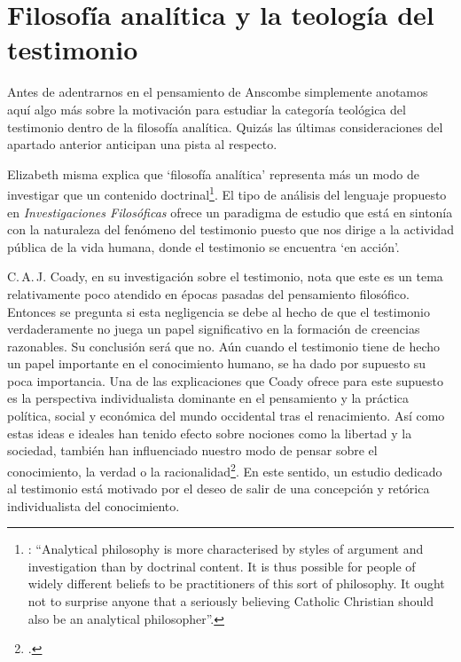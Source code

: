 \section{Filosofía analítica y la teología del testimonio}

Antes de adentrarnos en el pensamiento de Anscombe simplemente anotamos aquí algo más sobre la motivación para estudiar la categoría teológica del testimonio dentro de la filosofía analítica. Quizás las últimas consideraciones del apartado anterior anticipan una pista al respecto.

Elizabeth misma explica que `filosofía analítica' representa más un modo de investigar que un contenido doctrinal\footnote{\Cite[66]{anscombe2008faith:twenty}: \enquote{Analytical philosophy is more characterised by styles of argument and investigation than by doctrinal content. It is thus possible for people of widely different beliefs to be practitioners of this sort of philosophy. It ought not to surprise anyone that a seriously believing Catholic Christian should also be an analytical philosopher}.}. El tipo de análisis del lenguaje propuesto en \emph{Investigaciones Filosóficas} ofrece un paradigma de estudio que está en sintonía con la naturaleza del fenómeno del testimonio puesto que nos dirige a la actividad pública de la vida humana, donde el testimonio se encuentra `en acción'.

C.\,A.\,J. Coady, en su investigación sobre el testimonio, nota que este es un tema relativamente poco atendido en épocas pasadas del pensamiento filosófico. Entonces se pregunta si esta negligencia se debe al hecho de que el testimonio verdaderamente no juega un papel significativo en la formación de creencias razonables. Su conclusión será que no. Aún cuando el testimonio tiene de hecho un papel importante en el conocimiento humano, se ha dado por supuesto su poca importancia. Una de las explicaciones que Coady ofrece para este supuesto es la perspectiva individualista dominante en el pensamiento y la práctica política, social y económica del mundo occidental tras el renacimiento. Así como estas ideas e ideales han tenido efecto sobre nociones como la libertad y la sociedad, también han influenciado nuestro modo de pensar sobre el conocimiento, la verdad o la racionalidad\footnote{\cite[Cf.][6-13]{coady1992test}.}. En este sentido, un estudio dedicado al testimonio está motivado por el deseo de salir de una concepción y retórica individualista del conocimiento.

